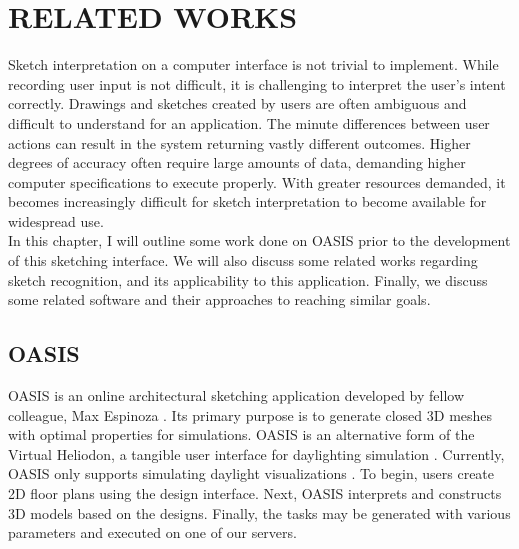 \chapter{RELATED WORKS} \label{sec:related}

Sketch interpretation on a computer interface is not trivial to implement. While recording user input is not difficult, it is challenging to interpret the user's intent correctly. Drawings and sketches created by users are often ambiguous and difficult to understand for an application. The minute differences between user actions can result in the system returning vastly different outcomes. Higher degrees of accuracy often require large amounts of data, demanding higher computer specifications to execute properly. With greater resources demanded, it becomes increasingly difficult for sketch interpretation to become available for widespread use. \\


In this chapter, I will outline some work done on OASIS prior to the development of this sketching interface. We will also discuss some related works regarding sketch recognition, and its applicability to this application. Finally, we discuss some related software and their approaches to reaching similar goals.


\section{OASIS}

OASIS is an online architectural sketching application developed by fellow colleague, Max Espinoza \cite{oasis2016}. Its primary purpose is to generate closed 3D meshes with optimal properties for simulations. OASIS is an alternative form of the Virtual Heliodon, a tangible user interface for daylighting simulation \cite{yusheng}.  Currently, OASIS only supports simulating daylight visualizations \cite{oasis2016}. To begin, users create 2D floor plans using the design interface. Next, OASIS interprets and constructs 3D models based on the designs. Finally, the tasks may be generated with various parameters and executed on one of our servers.


